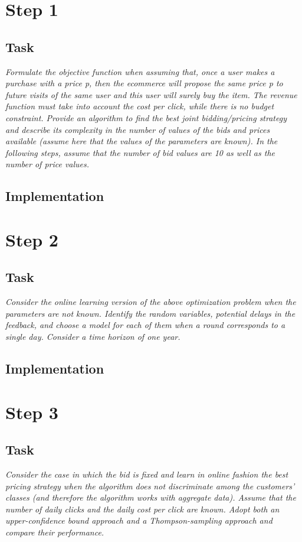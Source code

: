 \documentclass[12pt,a4paper]{report}
\begin{document}
		\section{Step 1}
			\subsection{Task}
\textit{Formulate the objective function when assuming that, once a user makes a purchase with a price p, then the ecommerce will propose the same price p to future visits of the same user and this user will surely buy the item. The revenue function must take into account the cost per click, while there is no budget constraint. Provide an algorithm to find the best joint bidding/pricing strategy and describe its complexity in the number of values of the bids and prices available (assume here that the values of the parameters are known). In the following steps, assume that the number of bid values are 10 as well as the number of price values.}
			\subsection{Implementation}

		\section{Step 2}
			\subsection{Task}
\textit{Consider the online learning version of the above optimization problem when the parameters are not known. Identify the random variables, potential delays in the feedback, and choose a model for each of them when a round corresponds to a single day. Consider a time horizon of one year.}
			\subsection{Implementation}

		\section{Step 3}
			\subsection{Task}
\textit{Consider the case in which the bid is fixed and learn in online fashion the best pricing strategy when the algorithm does not discriminate among the customers’ classes (and therefore the algorithm works with aggregate data). Assume that the number of daily clicks and the daily cost per click are known. Adopt both an upper-confidence bound approach and a Thompson-sampling approach and compare their performance.}
\end{document}
